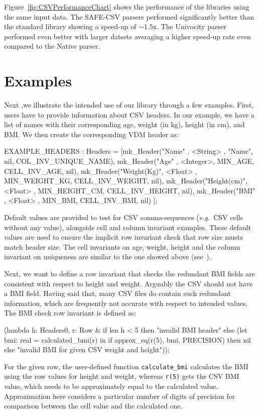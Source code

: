 \documentclass[runningheads,a4paper]{llncs}
\begin{document}
 Figure~\ref{fig:CSVPerformanceChart} shows the performance of the libraries using the same input data. The SAFE-CSV parsers performed significantly better than the standard library showing a speed-up of \(\sim 1.5\)x. The Univocity parser performed even better with larger datsets averaging a higher speed-up rate even compared to the Native parser.

\section{Examples}\label{sec:Examples}

Next ,we illustrate the intended use of our library through a few examples. First, users have to provide information about CSV headers. In our example, we have a list of names with their corresponding age, weight (in kg), height (in cm), and BMI. We then create the corresponding VDM header as:
%
\begin{vdmsl}[frame=none,basicstyle=\ttfamily\scriptsize]
	EXAMPLE_HEADERS : Headers = 
        [mk_Header("Name"      , <String> ,  "Name", nil, COL_INV_UNIQUE_NAME),
         mk_Header("Age"       , <Integer>,       MIN_AGE, CELL_INV_AGE, nil),
         mk_Header("Weight(Kg)", <Float>  , MIN_WEIGHT_KG, CELL_INV_WEIGHT, nil),
         mk_Header("Height(cm)", <Float>  , MIN_HEIGHT_CM, CELL_INV_HEIGHT, nil),
         mk_Header("BMI"       , <Float>  ,       MIN_BMI, CELL_INV_BMI, nil) ];
\end{vdmsl} 
%
Default values are provided to test for CSV comma-sequences (\textit{e.g.}~CSV cells without any value), alongside cell and column invariant examples. These default values are used to ensure the implicit row invariant check that row size musts match header size. The cell invariants on age, weight, height and the column invariant on uniqueness are similar to the one showed above (see~).

Next, we want to define a row invariant that checks the redundant BMI fields are consistent with respect to height and weight. Arguably the CSV should not have a BMI field. Having said that, many CSV files do contain such redundant information, which are frequently not accurate with respect to intended values. The BMI check row invariant is defined as:
%
\begin{vdmsl}[frame=none,basicstyle=\ttfamily\scriptsize]    
    (lambda h: Headers0, r: Row &
    	  if len h < 5 then "invalid BMI header"
    	  else 
		      (let bmi: real = calculated_bmi(r) in
			      if approx_eq(r(5), bmi, PRECISION) then nil 
			      else "invalid BMI for given CSV weight and height"));
\end{vdmsl}
%
For the given row, the user-defined function \texttt{calculate\_bmi} calculates the BMI using the row values for height and weight, whereas \texttt{r(5)} gets the CSV BMI value, which needs to be approximately equal to the calculated value. Approximation here considers a particular number of digits of precision for comparison between the cell value and the calculated one.    
\end{document}
